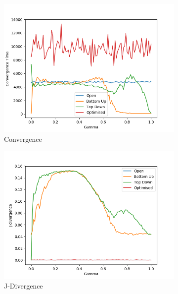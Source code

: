 \begin{figure}[H]
 \centering
  \begin{subfigure}[ht]{0.45\textwidth}
    \includegraphics[width=\textwidth]{Images/Figures/ListenerModelPlots/FIE/Convergence.png}
    \caption{Convergence}
 \end{subfigure}
 \hfill
 \begin{subfigure}[ht]{0.45\textwidth}
    \includegraphics[width=\textwidth]{Images/Figures/ListenerModelPlots/FIE/J-Div.png}
    \caption{J-Divergence}
 \end{subfigure}
 \hfill
 \begin{subfigure}[ht]{0.45\textwidth}

\end{subfigure}
\end{figure}
